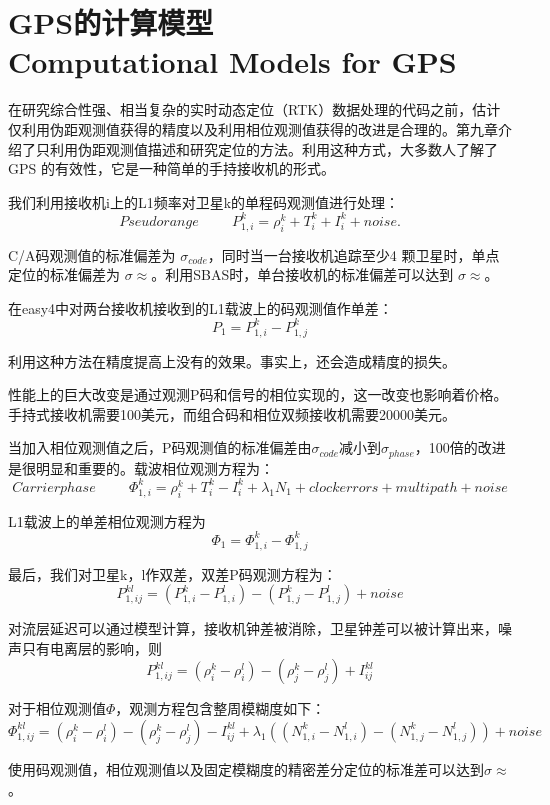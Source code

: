 \section[GPS的计算模型]{GPS的计算模型\\Computational Models for GPS}
在研究综合性强、相当复杂的实时动态定位（RTK）数据处理的代码之前，估计仅利用伪距观测值获得的精度以及利用相位观测值获得的改进是合理的。第九章介绍了只利用伪距观测值描述和研究定位的方法。利用这种方式，大多数人了解了GPS 的有效性，它是一种简单的手持接收机的形式。

我们利用接收机i上的L1频率对卫星k的单程码观测值进行处理：
$$
Pseudorange  \hspace{1cm} P_{1,i}^{k}=\rho_{i}^{k}+T_{i}^{k}+I_{i}^{k}+noise.
$$

C/A码观测值的标准偏差为 $\sigma_{code}$，同时当一台接收机追踪至少4 颗卫星时，单点定位的标准偏差为 $\sigma \approx$。利用SBAS时，单台接收机的标准偏差可以达到 $\sigma \approx$。

在easy4中对两台接收机接收到的L1载波上的码观测值作单差：
$$
P_{1}=P_{1,i}^{k}-P_{1,j}^{k}
$$

利用这种方法在精度提高上没有的效果。事实上，还会造成精度的损失。

性能上的巨大改变是通过观测P码和信号的相位实现的，这一改变也影响着价格。手持式接收机需要100美元，而组合码和相位双频接收机需要20000美元。

当加入相位观测值之后，P码观测值的标准偏差由$\sigma_{code}$减小到$\sigma_{phase}$，100倍的改进是很明显和重要的。载波相位观测方程为：
$$
Carrier phase  \hspace{1cm} \Phi_{1,i}^{k}=\rho_{i}^{k}+T_{i}^{k}-I_{i}^{k}+\lambda_{1}N_{1}+ clock errors + multipath + noise
$$

L1载波上的单差相位观测方程为
$$
\Phi_{1}=\Phi_{1,i}^{k}-\Phi_{1,j}^{k}
$$

最后，我们对卫星k，l作双差，双差P码观测方程为：
$$
P_{1,ij}^{kl}=(P_{1,i}^{k}-P_{1,i}^{l})-(P_{1,j}^{k}-P_{1,j}^{l})+noise
$$

对流层延迟可以通过模型计算，接收机钟差被消除，卫星钟差可以被计算出来，噪声只有电离层的影响，则
$$
P_{1,ij}^{kl}=(\rho_{i}^{k}-\rho_{i}^{l})-(\rho_{j}^{k}-\rho_{j}^{l})+I_{ij}^{kl}
$$

对于相位观测值$\Phi$，观测方程包含整周模糊度如下：
$$
\Phi_{1,ij}^{kl}=(\rho_{i}^{k}-\rho_{i}^{l})-(\rho_{j}^{k}-\rho_{j}^{l})-I_{ij}^{kl}+\lambda_{1}((N_{1,i}^{k}-N_{1,i}^{l})-(N_{1,j}^{k}-N_{1,j}^{l}))+noise
$$

使用码观测值，相位观测值以及固定模糊度的精密差分定位的标准差可以达到$\sigma \approx$。

